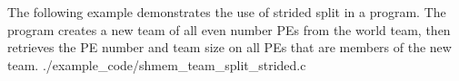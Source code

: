\begin{apidefinition}
\begin{apiexamples}

    \apicexample
    {The following example demonstrates the use of strided split in a
    \Cstd[11] program. The program creates a new team of all even number
    \acp{PE} from the world team, then retrieves the \ac{PE} number and
    team size on all \acp{PE} that are members of the new team.}
    {./example_code/shmem_team_split_strided.c}
    {}

\end{apiexamples}

\end{apidefinition}
